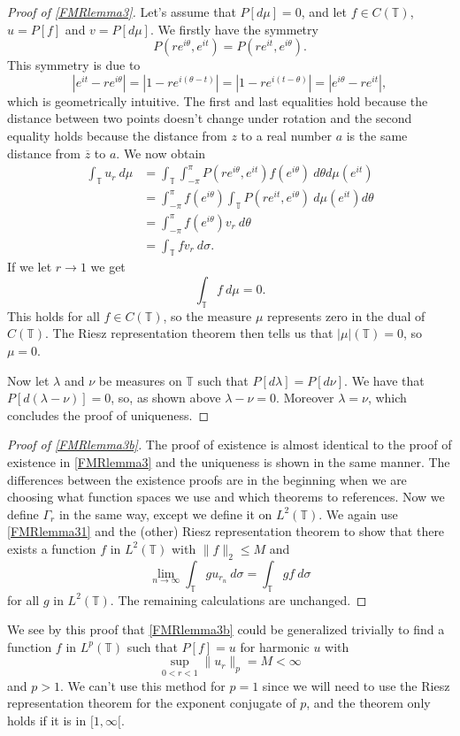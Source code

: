 \documentclass[a4paper,12pt,twoside,BCOR=10mm]{scrbook}
\theoremstyle{definition}
\theoremstyle{definition}
\theoremstyle{definition}
\begin{document}
\begin{proof}[Proof of \ref{FMRlemma3}]
Let's assume that $P[d\mu] = 0$, and let $f \in C(\mathbb{T})$, $u = P[f]$ and $v = P[d\mu]$.
We firstly have the symmetry
\[
	P(re^{i\theta}, e^{it})
	=
	P(re^{it}, e^{i\theta}).
\]
This symmetry is due to
\[
	|e^{it} - re^{i\theta}|
	=
	|1 - re^{i(\theta - t)}|
	=
	|1 - re^{i(t - \theta)}|
	=
	|e^{i\theta} - re^{it}|,
\]
which is geometrically intuitive.
The first and last equalities hold because the distance between two points doesn't change under rotation and the second equality holds because the distance from $z$ to a real number $a$ is the same distance from $\overline{z}$ to $a$.
We now obtain
\begin{align*}
\int_{\mathbb{T}} u_r\ d\mu
&= \int_{\mathbb{T}} \int_{-\pi}^{\pi} P(re^{i\theta}, e^{it}) f(e^{i\theta})\ d\theta d\mu(e^{it})\\
&= \int_{-\pi}^{\pi} f(e^{i\theta}) \int_{\mathbb{T}} P(re^{it}, e^{i\theta})\ d\mu(e^{it}) d\theta\\
&= \int_{-\pi}^{\pi} f(e^{i\theta}) v_r\ d\theta\\
&= \int_{\mathbb{T}} fv_r\ d\sigma.
\end{align*}
If we let $r \rightarrow 1$ we get
\[
	\int_{\mathbb{T}}f\ d\mu = 0.
\]
This holds for all $f \in C(\mathbb{T})$, so the measure $\mu$ represents zero in the dual of $C(\mathbb{T})$.
The Riesz representation theorem then tells us that $|\mu|(\mathbb{T}) = 0$, so $\mu = 0$.

Now let $\lambda$ and $\nu$ be measures on $\mathbb{T}$ such that $P[d\lambda] = P[d\nu]$.
We have that $P[d(\lambda - \nu)] = 0$, so, as shown above $\lambda - \nu = 0$.
Moreover $\lambda = \nu$, which concludes the proof of uniqueness.
\end{proof}
\begin{proof}[Proof of \ref{FMRlemma3b}]
The proof of existence is almost identical to the proof of existence in \ref{FMRlemma3} and the uniqueness is shown in the same manner.
The differences between the existence proofs are in the beginning when we are choosing what function spaces we use and which theorems to references.
Now we define $\Gamma_r$ in the same way, except we define it on $L^2(\mathbb{T})$.
We again use \ref{FMRlemma31} and the (other) Riesz representation theorem to show that there exists a function $f$ in $L^2(\mathbb{T})$ with $\|f\|_2 \leq M$ and
\[
	\lim_{n \rightarrow \infty} \int_{\mathbb{T}} gu_{r_n}\ d\sigma = \int_{\mathbb{T}}gf\ d\sigma
\]
for all $g$ in $L^2(\mathbb{T})$.
The remaining calculations are unchanged.
\end{proof}
We see by this proof that \ref{FMRlemma3b} could be generalized trivially to find a function $f$ in $L^p(\mathbb{T})$ such that $P[f] = u$ for harmonic $u$ with
\[
	\sup_{0 < r < 1} \|u_r\|_p = M < \infty
\]
and $p > 1$.
We can't use this method for $p = 1$ since we will need to use the Riesz representation theorem for the exponent conjugate of $p$, and the theorem only holds if it is in $[1, \infty[$.
\end{document}
